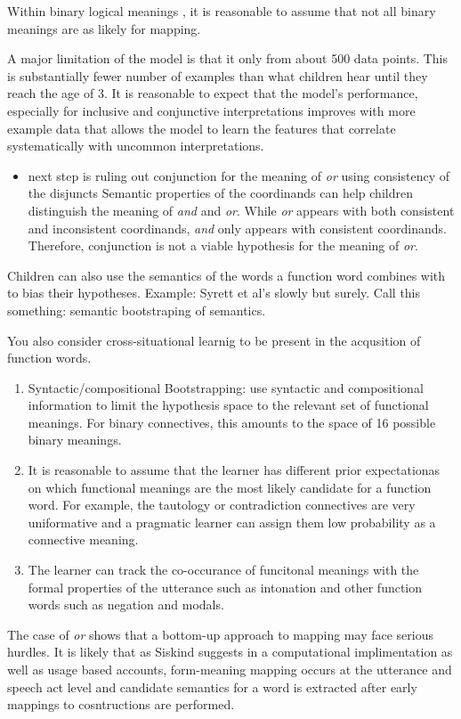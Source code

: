 \documentclass[oneside]{report}
\theoremstyle{definition}
\theoremstyle{definition}
\theoremstyle{definition}
\theoremstyle{remark}
\begin{document}
Within binary logical meanings , it is reasonable to assume that not all
binary meanings are as likely for mapping.

A major limitation of the model is that it only from about 500 data
points. This is substantially fewer number of examples than what
children hear until they reach the age of 3. It is reasonable to expect
that the model's performance, especially for inclusive and conjunctive
interpretations improves with more example data that allows the model to
learn the features that correlate systematically with uncommon
interpretations.
\begin{itemize}
\tightlist
\item
  next step is ruling out conjunction for the meaning of \emph{or} using
  consistency of the disjuncts Semantic properties of the coordinands
  can help children distinguish the meaning of \emph{and} and \emph{or}.
  While \emph{or} appears with both consistent and inconsistent
  coordinands, \emph{and} only appears with consistent coordinands.
  Therefore, conjunction is not a viable hypothesis for the meaning of
  \emph{or}.
\end{itemize}
Children can also use the semantics of the words a function word
combines with to bias their hypotheses. Example: Syrett et al's slowly
but surely. Call this something: semantic bootstraping of semantics.

You also consider cross-situational learnig to be present in the
acqusition of function words.
\begin{enumerate}
\def\labelenumi{\arabic{enumi}.}
\item
  Syntactic/compositional Bootstrapping: use syntactic and compositional
  information to limit the hypothesis space to the relevant set of
  functional meanings. For binary connectives, this amounts to the space
  of 16 possible binary meanings.
\item
  It is reasonable to assume that the learner has different prior
  expectationas on which functional meanings are the most likely
  candidate for a function word. For example, the tautology or
  contradiction connectives are very uniformative and a pragmatic
  learner can assign them low probability as a connective meaning.
\item
  The learner can track the co-occurance of funcitonal meanings with the
  formal properties of the utterance such as intonation and other
  function words such as negation and modals.
\end{enumerate}
The case of \emph{or} shows that a bottom-up approach to mapping may
face serious hurdles. It is likely that as Siskind suggests in a
computational implimentation as well as usage based accounts,
form-meaning mapping occurs at the utterance and speech act level and
candidate semantics for a word is extracted after early mappings to
cosntructions are performed.
\end{document}
